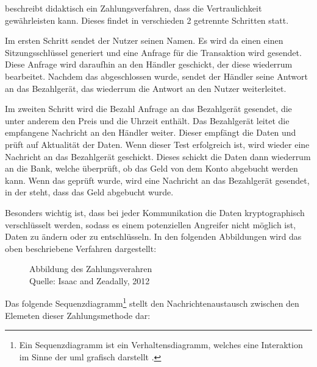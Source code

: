 \cite{refart:JTAS} beschreibt didaktisch ein Zahlungsverfahren, dass die Vertraulichkeit gewährleisten kann.
Dieses findet in verschieden 2 getrennte Schritten statt.

Im ersten Schritt sendet der Nutzer seinen Namen. Es wird da einen einen Sitzungsschlüssel generiert und 
eine Anfrage für die Transaktion wird gesendet. Diese Anfrage wird daraufhin an den Händler geschickt, der 
diese wiederrum bearbeitet. Nachdem das abgeschlossen wurde, sendet der Händler seine Antwort an das Bezahlgerät, 
das wiederrum die Antwort an den Nutzer weiterleitet. 

Im zweiten Schritt wird die Bezahl Anfrage an das Bezahlgerät gesendet, die unter anderem den Preis und die 
Uhrzeit enthält. Das Bezahlgerät leitet die empfangene Nachricht an den Händler weiter. Dieser empfängt die Daten 
und prüft auf Aktualität der Daten. Wenn dieser Test erfolgreich ist, wird wieder eine Nachricht an das Bezahlgerät 
geschickt. Dieses schickt die Daten dann wiederrum an die Bank, welche überprüft, ob das Geld von dem Konto 
abgebucht werden kann. Wenn das geprüft wurde, wird eine Nachricht an das Bezahlgerät gesendet, in der steht, 
dass das Geld abgebucht wurde. 

Besonders wichtig ist, dass bei jeder Kommunikation die Daten kryptographisch verschlüsselt werden, sodass es einem 
potenziellen Angreifer nicht möglich ist, Daten zu ändern oder zu entschlüsseln. In den folgenden Abbildungen wird
das oben beschriebene Verfahren dargestellt:

\begin{figure}[H]
    \caption{Abbildung des Zahlungsverahren\\ Quelle: Isaac and Zeadally, 2012}
    \label{fig:refart:JTAS}
\end{figure}

Das folgende Sequenzdiagramm\footnote{Ein Sequenzdiagramm ist ein Verhaltensdiagramm, welches eine Interaktion
im Sinne der \acrfull{uml} grafisch darstellt \cite{refbook:IASE}.} stellt den 
Nachrichtenaustausch zwischen den Elemeten dieser Zahlungsmethode dar:

